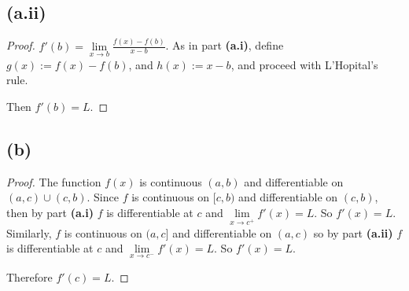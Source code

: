\documentclass{article}
\begin{document}
\subsection*{(a.ii)}
\begin{proof}
	$f'(b) = \lim\limits_{x \to b} \frac{f(x) - f(b)}{x - b}$. As in part \textbf{(a.i)}, define $g(x) := f(x) - f(b)$, and $h(x) := x - b$, and proceed with L'Hopital's rule. 
	
	Then $f'(b) = L$.
\end{proof}
\subsection*{(b)}
\begin{proof}
	The function $f(x)$ is continuous $(a, b)$ and differentiable on $(a, c) \cup (c, b)$. Since $f$ is continuous on $[c, b)$ and differentiable on $(c, b)$, then by part \textbf{(a.i)} $f$ is differentiable at $c$ and $\lim\limits_{x \to c^+} f'(x) = L$. So $f'(x) = L$. Similarly, $f$ is continuous on $(a, c]$ and differentiable on $(a, c)$ so by part \textbf{(a.ii)} $f$ is differentiable at $c$ and $\lim\limits_{x \to c^-}f'(x) = L$. So $f'(x) = L$.
	
	Therefore $f'(c) = L$.
\end{proof}
\end{document}
